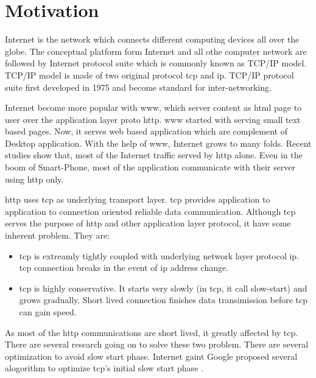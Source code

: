 \section{Motivation}

Internet is the network which connects different computing devices all over the globe. The conceptual platform form Internet and all othe computer network are followed by Internet protocol suite which is commonly known as TCP/IP model. TCP/IP model is made of two original protocol \acrfull{tcp} and \acrfull{ip}. TCP/IP protocol suite first developed in 1975 and become standard for inter-networking.

Internet become more popular with \acrfull{www}, which server content as html page to user over the application layer proto \acrfull{http}. \acrshort{www} started with serving small text based pages. Now, it serves web based application which are complement of Desktop application. With the help of \acrshort{www}, Internet grows to many folds. Recent studies show that, most of the Internet traffic served by \acrshort{http} alone. Even in the boom of Smart-Phone, most of the application communicate with their server using \acrshort{http} only.

\acrshort{http} uses \acrshort{tcp} as underlying transport layer. \acrshort{tcp} provides application to application to connection oriented reliable data communication. Although \acrshort{tcp} serves the purpose of \acrshort{http} and other application layer protocol, it have some inherent problem. They are:
\begin{itemize}
	\item \acrshort{tcp} is extreamly tightly coupled with underlying network layer protocol \acrshort{ip}. \acrshort{tcp} connection breaks in the event of \acrshort{ip} address change.
	\item \acrshort{tcp} is highly conservative. It starts very slowly (in \acrshort{tcp}, it call slow-start) and grows gradually. Short lived connection finishes data transimission before \acrshort{tcp} can gain speed.
\end{itemize}

As most of the \acrshort{http} communications are short lived, it greatly affected by \acrshort{tcp}. There are several research going on to solve these two problem. There are several optimization to avoid slow start phase. Internet gaint Google proposed several alogorithm to optimize \acrshort{tcp}'s initial slow start phase \cite{google-fast-open,google-long-initcwnd}.